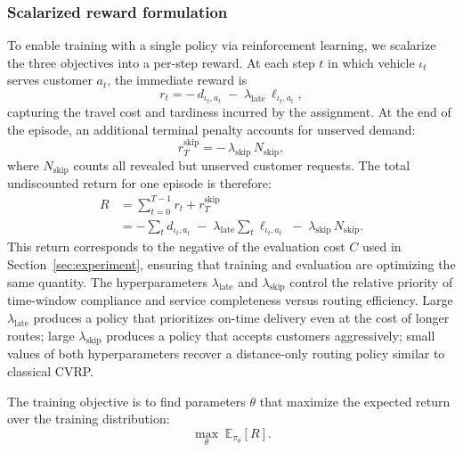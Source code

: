 \documentclass[conference]{IEEEtran}
\begin{document}
\subsubsection{Scalarized reward formulation}
To enable training with a single policy via reinforcement learning, we scalarize the three objectives into a per-step reward.
At each step $t$ in which vehicle $\iota_t$ serves customer $a_t$, the immediate reward is
\[
r_t = -\,d_{\iota_t, a_t} \;-\; \lambda_{\mathrm{late}}\,\ell_{\iota_t, a_t},
\]
capturing the travel cost and tardiness incurred by the assignment.
At the end of the episode, an additional terminal penalty accounts for unserved demand:
\[
r_T^{\mathrm{skip}} = -\,\lambda_{\mathrm{skip}}\, N_{\mathrm{skip}},
\]
where $N_{\mathrm{skip}}$ counts all revealed but unserved customer requests.
The total undiscounted return for one episode is therefore:
\begin{align*}
R &= \sum_{t=0}^{T-1} r_t + r_T^{\mathrm{skip}} \\
  &= -\sum_t d_{\iota_t, a_t}
  \;-\; \lambda_{\mathrm{late}} \sum_t \ell_{\iota_t, a_t}
  \;-\; \lambda_{\mathrm{skip}}\, N_{\mathrm{skip}}.
\end{align*}
This return corresponds to the negative of the evaluation cost $C$ used in Section~\ref{sec:experiment}, ensuring that training and evaluation are optimizing the same quantity.
The hyperparameters $\lambda_{\mathrm{late}}$ and $\lambda_{\mathrm{skip}}$ control the relative priority of time-window compliance and service completeness versus routing efficiency.
Large $\lambda_{\mathrm{late}}$ produces a policy that prioritizes on-time delivery even at the cost of longer routes; large $\lambda_{\mathrm{skip}}$ produces a policy that accepts customers aggressively; small values of both hyperparameters recover a distance-only routing policy similar to classical CVRP.

The training objective is to find parameters $\theta$ that maximize the expected return over the training distribution:
\[
\max_\theta \;\mathbb{E}_{\pi_\theta}\!\left[R\right].
\]
\end{document}
